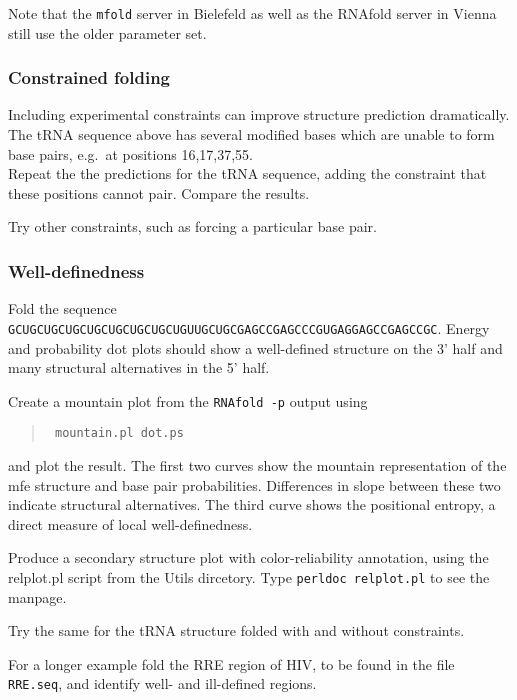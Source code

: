\documentclass{article}
\begin{document}
Note that the {\tt mfold} server in Bielefeld as well as the RNAfold server
in Vienna still use the older parameter set.

\subsubsection{Constrained folding}

Including experimental constraints can improve structure prediction
dramatically. The tRNA sequence above has several modified bases which are
unable to form base pairs, e.g.\ at positions 16,17,37,55.\\
Repeat the the predictions for the tRNA sequence, adding the constraint
that these positions cannot pair. Compare the results.

Try other constraints, such as forcing a particular base pair.


\subsubsection{Well-definedness}

Fold the sequence\\
{\small\tt GCUGCUGCUGCUGCUGCUGCUGCUGUUGCUGCGAGCCGAGCCCGUGAGGAGCCGAGCCGC}.
Energy and probability dot plots should show a well-defined structure on
the 3' half and many structural alternatives in the 5' half.

Create a mountain plot from the {\tt RNAfold -p} output using
\begin{quote}\tt
mountain.pl dot.ps
\end{quote} and plot the result. The first two curves show the
mountain representation of the mfe structure and base pair probabilities.
Differences in slope between these two indicate structural alternatives.
The third curve shows the positional entropy, a direct measure of local
well-definedness. 

Produce a secondary structure plot with color-reliability annotation, using
the relplot.pl script from the Utils dircetory. Type \texttt{perldoc
  relplot.pl} to see the manpage.

Try the same for the tRNA structure folded with and without constraints.

For a longer example fold the RRE region of HIV, to be found in the file
{\tt RRE.seq}, and identify well- and ill-defined regions.
\end{document}
